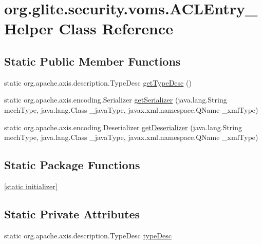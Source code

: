 \hypertarget{classorg_1_1glite_1_1security_1_1voms_1_1ACLEntry__Helper}{
\section{org.glite.security.voms.ACLEntry\_\-Helper Class Reference}
\label{classorg_1_1glite_1_1security_1_1voms_1_1ACLEntry__Helper}
}
\subsection*{Static Public Member Functions}
\begin{DoxyCompactItemize}
\item 
static org.apache.axis.description.TypeDesc \hyperlink{classorg_1_1glite_1_1security_1_1voms_1_1ACLEntry__Helper_a810e21b99a71e03052cd0c47f204d376}{getTypeDesc} ()
\item 
static org.apache.axis.encoding.Serializer \hyperlink{classorg_1_1glite_1_1security_1_1voms_1_1ACLEntry__Helper_af94b6fbc24a35aaab6c18775e5bc1157}{getSerializer} (java.lang.String mechType, java.lang.Class \_\-javaType, javax.xml.namespace.QName \_\-xmlType)
\item 
static org.apache.axis.encoding.Deserializer \hyperlink{classorg_1_1glite_1_1security_1_1voms_1_1ACLEntry__Helper_a64e627d01797414d560ab5d2b2970df4}{getDeserializer} (java.lang.String mechType, java.lang.Class \_\-javaType, javax.xml.namespace.QName \_\-xmlType)
\end{DoxyCompactItemize}
\subsection*{Static Package Functions}
\begin{DoxyCompactItemize}
\item 
\hyperlink{classorg_1_1glite_1_1security_1_1voms_1_1ACLEntry__Helper_a1a0d8b1a216154e2ba1e57a4d1a40ab8}{\mbox{[}static initializer\mbox{]}}
\end{DoxyCompactItemize}
\subsection*{Static Private Attributes}
\begin{DoxyCompactItemize}
\item 
static org.apache.axis.description.TypeDesc \hyperlink{classorg_1_1glite_1_1security_1_1voms_1_1ACLEntry__Helper_ac712c33ba5fe0290c68276483ca17fc5}{typeDesc}
\end{DoxyCompactItemize}


